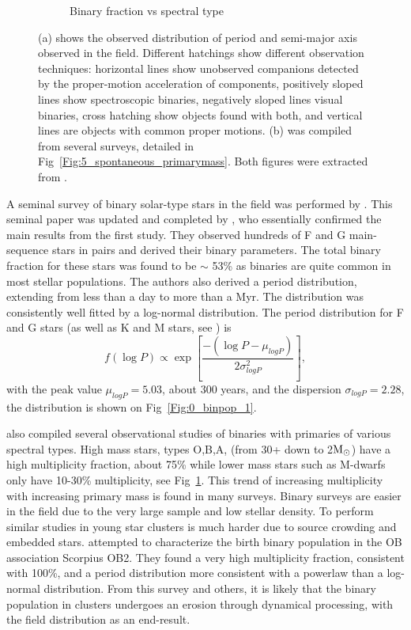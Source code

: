 \begin{figure}
\begin{subfigure}[b]{0.48\textwidth}
        \caption{Binary fraction vs spectral type}
        \label{Fig:0_binpop_2}
    \end{subfigure}
\caption{(a) shows the observed distribution of period and semi-major axis observed in the field. Different hatchings show different observation techniques: horizontal lines show unobserved companions detected by the proper-motion acceleration of components, positively sloped lines show spectroscopic binaries, negatively sloped lines visual binaries, cross hatching show objects found with both, and vertical lines are objects with common proper motions. (b) was compiled from several surveys, detailed in Fig~\ref{Fig:5_spontaneous_primarymass}. Both figures were extracted from \cite{Raghavan2010}. }
\label{Fig:0_binpopulation}
\end{figure}




A seminal survey of binary solar-type stars in the field was performed by \cite{DM91}. This seminal paper was updated and completed by \cite{Raghavan2010}, who essentially confirmed the main results from the first study. They observed hundreds of F and G main-sequence stars in pairs and derived their binary parameters. The total binary fraction for these stars was found to be $\sim$ 53\% as binaries are quite common in most stellar populations.
  The authors also derived a period distribution, extending from less than a day to more than a Myr. The distribution was consistently well fitted by a log-normal distribution. The period distribution for F and G stars (as well as K and M stars, see \citealt{Fischer1992}) is
\begin{equation}
f( \log{P})\propto \exp \left[ \frac{- ( \log{P} - \mu_{logP})}{ 2 \sigma_{logP}^2} \right],
\end{equation}
with the peak value $\mu_{logP} = 5.03$, about 300 years, and the dispersion $\sigma_{logP} = 	2.28$, the distribution is shown on Fig~\ref{Fig:0_binpop_1}.

\cite{Raghavan2010} also compiled several observational studies of binaries with primaries of various spectral types. High mass stars, types O,B,A, (from 30+ down to 2${\textrm{M}_\odot}$) have a high multiplicity fraction, about 75\%  while lower mass stars such as M-dwarfs only have 10-30\% multiplicity, see Fig~\ref{Fig:0_binpop_2}. This trend of increasing multiplicity with increasing primary mass is found in many surveys.
Binary surveys are easier in the field due to the very large sample and low stellar density. To perform similar studies in young star clusters is much harder due to source crowding and embedded stars. \cite{Kouwenhoven2007} attempted to characterize the birth binary population in the OB association Scorpius OB2. They found a very high multiplicity fraction, consistent with 100\%, and a period distribution more consistent with a powerlaw than a log-normal distribution. From this survey and others, it is likely that the binary population in clusters undergoes an erosion through dynamical processing, with the field distribution as an end-result.

